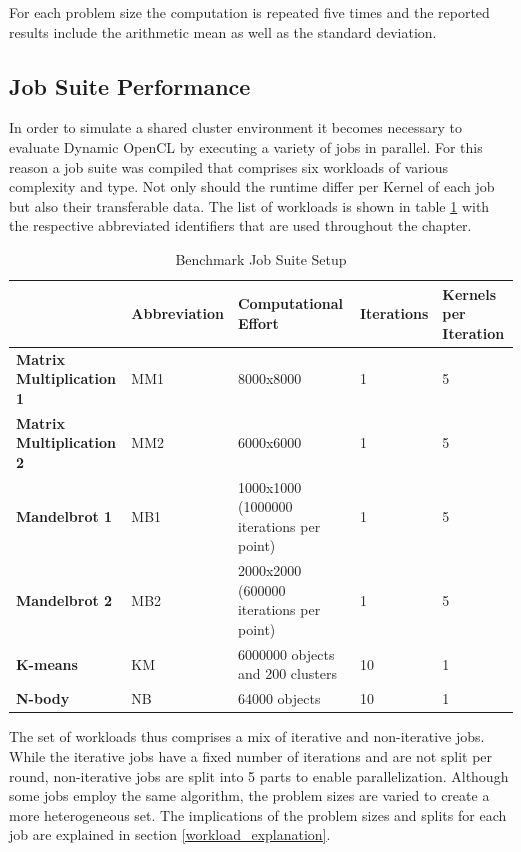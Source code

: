 For each problem size the computation is repeated five times and the reported results include the arithmetic mean as well as the standard deviation. 

\subsection{Job Suite Performance}

In order to simulate a shared cluster environment it becomes necessary to evaluate Dynamic OpenCL by executing a variety of jobs in parallel. For this reason a job suite was compiled that comprises six workloads of various complexity and type. Not only should the runtime differ per Kernel of each job but also their transferable data. The list of workloads is shown in table \ref{table:benchmark_job_setup} with the respective abbreviated identifiers that are used throughout the chapter.

\begin{table}[!htb]
	\centering
	\begin{adjustbox}{width=0.95\textwidth}
		\small
		\begin{tabular}{l | l | l | l | l}
			~ & \textbf{Abbreviation}						& \textbf{Computational Effort}		& \textbf{Iterations}	& \textbf{Kernels per Iteration} \\
			\hline
			\textbf{Matrix Multiplication 1}	& MM1  	& 8000x8000  								& 1 	& 5 \\
			\textbf{Matrix Multiplication 2} 	& MM2	& 6000x6000  								& 1		& 5 \\
			\textbf{Mandelbrot 1}     		 	& MB1	& 1000x1000 (1000000 iterations per point) 	& 1		& 5 \\
			\textbf{Mandelbrot 2}				& MB2	& 2000x2000 (600000 iterations per point)  	& 1		& 5 \\
			\textbf{K-means}          			& KM 	& 6000000 objects and 200 clusters  		& 10	& 1 \\
			\textbf{N-body}    		 			& NB 	& 64000 objects  							& 10	& 1 \\		
		\end{tabular}
	\end{adjustbox}
	
	\caption{Benchmark Job Suite Setup}
	\label{table:benchmark_job_setup}
\end{table}

The set of workloads thus comprises a mix of iterative and non-iterative jobs. While the iterative jobs have a fixed number of iterations and are not split per round, non-iterative jobs are split into 5 parts to enable parallelization. Although some jobs employ the same algorithm, the problem sizes are varied to create a more heterogeneous set. The implications of the problem sizes and splits for each job are explained in section \ref{workload_explanation}.

